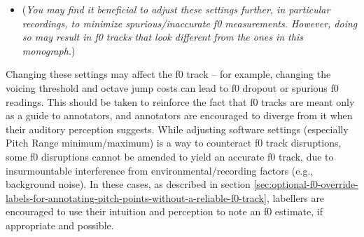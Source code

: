 \documentclass[11pt, twoside]{memoir}
\begin{document}
{{{\begin{itemize}
\begin{itemize}
		\item Very accurate=true
		\item Silence threshold=0.03
		\item Voicing threshold=0.5
		\item Octave cost=0.05
		\item Octave jump cost=0.5
		\item Voiced/Unvoiced cost=0.2
	\end{itemize}
\item[] (\textit{You may find it beneficial to adjust these settings further, in particular recordings, to minimize spurious\slash inaccurate f0 measurements. However, doing so may result in f0 tracks that look different from the ones in this monograph.})
\end{itemize}
Changing these settings may affect the f0 track – for example, changing the voicing threshold and octave jump costs can lead to f0 dropout or spurious f0 readings. This should be taken to reinforce the fact that f0 tracks are meant only as a guide to annotators, and annotators are encouraged to diverge from it when their auditory perception suggests. 
While adjusting software settings (especially Pitch Range minimum\slash maximum) is a way to counteract f0 track disruptions, some f0 disruptions cannot be amended to yield an accurate f0 track, due to insurmountable interference from environmental\slash recording factors (e.g., background noise). In these cases, as described in section \ref{sec:optional-f0-override-labels-for-annotating-pitch-points-without-a-reliable-f0-track}, labellers are encouraged to use their intuition and perception to note an f0 estimate, if appropriate and possible. 
}}}
\end{document}
